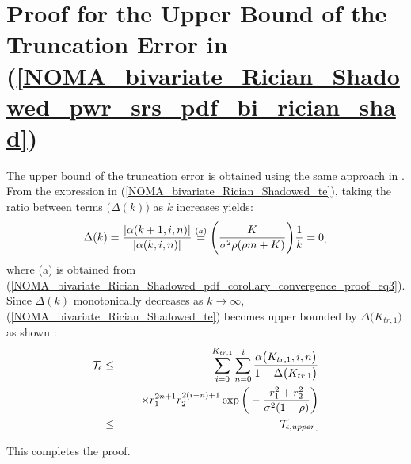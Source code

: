 \section{Proof for the Upper Bound of the Truncation Error in (\ref{NOMA_bivariate_Rician_Shadowed_pwr_srs_pdf_bi_rician_shad})} \label{NOMA_bivariate_Rician_Shadowed_lemma_te_upper_proof}
The upper bound of the truncation error is obtained using the same approach in \cite{o2011product}. From the expression in (\ref{NOMA_bivariate_Rician_Shadowed_te}), taking the ratio between terms $\big(\Delta(k)\big)$ as $k$ increases yields: 
\begin{eqnarray}
\Delta(k) = \frac{|\alpha(k+1,i,n)|}{|\alpha(k,i,n)|} \stackrel{(a)}{=} \Bigg( \frac{K}{\sigma^2 \rho (\rho m + K)} \Bigg) \frac{1}{k} = 0_, \label{NOMA_bivariate_Rician_Shadowed_lemma_te_upper_proof_eq1}
\end{eqnarray}
where (a) is obtained from (\ref{NOMA_bivariate_Rician_Shadowed_pdf_corollary_convergence_proof_eq3}). Since $\Delta(k)$ monotonically decreases as $k \to \infty$, (\ref{NOMA_bivariate_Rician_Shadowed_te}) becomes upper bounded by $\Delta\big(K_{tr,1}\big)$ as shown \cite[eq. (92)]{o2011product}:
\begin{eqnarray}
\mathcal{T}_{\epsilon} & \leq & \sum_{i=0}^{K_{tr,1}} \sum_{n=0}^{i} \frac{\alpha\big(K_{tr,1},i,n\big)}{1-\Delta\big(K_{tr,1}\big)} \nonumber \\
 & & \hspace{0.5cm} \times r_1^{2n+1} r_2^{2(i-n)+1} \exp\bigg( -\frac{r_1^2 + r_2^2}{\sigma^2 (1-\rho)} \bigg) \\
 & \leq & {\mathcal{T}_{\epsilon,upper}}_. \nonumber
\end{eqnarray}

This completes the proof.

